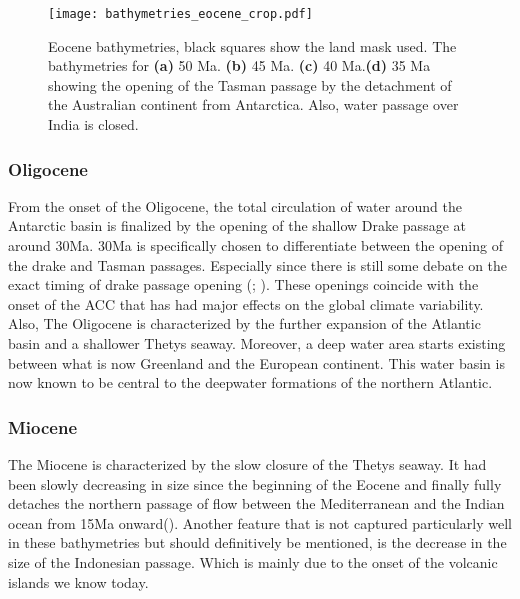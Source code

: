\begin{figure}[H]
	\texttt{[image: bathymetries\_eocene\_crop.pdf]}
	\caption{Eocene bathymetries, black squares show the land mask used. The bathymetries for \textbf{(a)} 50 Ma. \textbf{(b)} 45 Ma. \textbf{(c)} 40 Ma.\textbf{(d)} 35 Ma showing the opening of the Tasman passage by the detachment of the Australian continent from Antarctica. Also, water passage over India is closed.}
\end{figure}

\begin{multicols}{2}
\subsubsection{Oligocene}
From the onset of the Oligocene, the total circulation of water around the Antarctic basin is finalized by the opening of the shallow Drake passage at around 30Ma. 30Ma is specifically chosen to differentiate between the opening of the drake and Tasman passages. Especially since there is still some debate on the exact timing of drake passage opening (\cite{Scher2006Apr}; \cite{Livermore2005Jul}). These openings coincide with the onset of the ACC that has had major effects on the global climate variability. Also, The Oligocene is characterized by the further expansion of the Atlantic basin and a shallower Thetys seaway. Moreover, a deep water area starts existing between what is now Greenland and the European continent. This water basin is now known to be central to the deepwater formations of the northern Atlantic.

\subsubsection{Miocene}

The Miocene is characterized by the slow closure of the Thetys seaway. It had been slowly decreasing in size since the beginning of the Eocene and finally fully detaches the northern passage of flow between the Mediterranean and the Indian ocean from 15Ma onward(\cite{Hamon2013Nov}). Another feature that is not captured particularly well in these bathymetries but should definitively be mentioned, is the decrease in the size of the Indonesian passage. Which is mainly due to the onset of the volcanic islands we know today.


\end{multicols}

